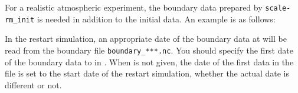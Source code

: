 For a realistic atmospheric experiment, the boundary data prepared by \verb|scale-rm_init|
is needed in addition to the initial data. An example is as follows:


In the restart simulation, an appropriate date of the boundary data at will be read from the boundary file \verb|boundary_***.nc|.
You should specify the first date of the boundary data to  in .
When  is not given, the date of the first data in the file is set to the start date of the restart simulation, whether the actual date is different or not.
